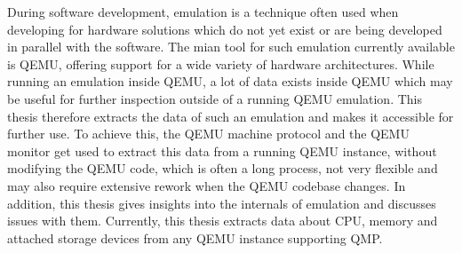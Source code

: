 
\Abstract
During software development, emulation is a technique often used when developing for hardware solutions which do not yet exist
or are being developed in parallel with the software.
The mian tool for such emulation currently available is QEMU, offering support for a wide variety of hardware architectures.
While running an emulation inside QEMU,
a lot of data exists inside QEMU which may be useful for further inspection outside of a running QEMU emulation.
This thesis therefore extracts the data of such an emulation and makes it accessible for further use.
To achieve this, the QEMU machine protocol and the QEMU monitor get used to extract this data from a running QEMU instance,
without modifying the QEMU code, which is often a long process,
not very flexible and may also require extensive rework when the QEMU codebase changes.
In addition, this thesis gives insights into the internals of emulation and discusses issues with them.
Currently, this thesis extracts data about CPU, memory and attached storage devices from any QEMU instance supporting QMP.